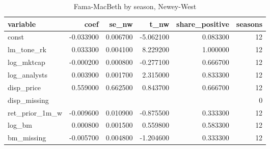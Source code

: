 \begin{table}
\caption{Fama-MacBeth by season, Newey-West}
\label{tab:t8_fama_macbeth__lm_tone__car_0_1_ff4__validation}
\begin{tabular}{lrrrrr}
\toprule
variable & coef & se\_nw & t\_nw & share\_positive & seasons \\
\midrule
const & -0.033900 & 0.006700 & -5.062100 & 0.083300 & 12 \\
lm\_tone\_rk & 0.033300 & 0.004100 & 8.229200 & 1.000000 & 12 \\
log\_mktcap & -0.000200 & 0.000800 & -0.277100 & 0.666700 & 12 \\
log\_analysts & 0.003900 & 0.001700 & 2.315000 & 0.833300 & 12 \\
disp\_price & 0.559000 & 0.662500 & 0.843700 & 0.666700 & 12 \\
disp\_missing &  &  &  &  & 0 \\
ret\_prior\_1m\_w & -0.009600 & 0.010900 & -0.875500 & 0.333300 & 12 \\
log\_bm & 0.000800 & 0.001500 & 0.559800 & 0.583300 & 12 \\
bm\_missing & -0.005700 & 0.004800 & -1.204600 & 0.333300 & 12 \\
\bottomrule
\end{tabular}
\end{table}
